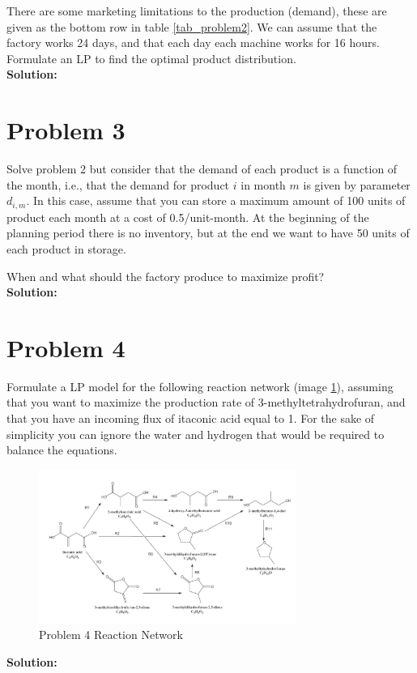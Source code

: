 \documentclass[11pt]{article}
\begin{document}
There are some marketing limitations to the production (demand), these are given as the bottom row in table \ref{tab_problem2}.
We can assume that the factory works 24 days, and that each day each machine works for
16 hours.
Formulate an LP to find the optimal product distribution.
\\
\textbf{Solution: }

\section{Problem 3}
Solve problem 2 but consider that the demand of each product is a function of
the month, i.e., that the demand for product $i$ in month $m$ is given by parameter $d_{i,m}$. In this
case, assume that you can store a maximum amount of 100 units of product each month at
a cost of 0.5/unit-month. At the beginning of the planning period there is no inventory, but at
the end we want to have 50 units of each product in storage.

When and what should the factory produce to maximize profit?
\\
\textbf{Solution: }

\section{Problem 4}
Formulate a LP model for the following reaction network (image \ref{fig:problem_4_rn}), assuming that you want
to maximize the production rate of 3-methyltetrahydrofuran, and that you have an incoming
flux of itaconic acid equal to 1. For the sake of simplicity you can ignore the water and
hydrogen that would be required to balance the equations.
\begin{figure}[htbp]
  \centerline{\includegraphics[width=0.75\textwidth]{images/image.png}}
  \caption{Problem 4 Reaction Network}
  \label{fig:problem_4_rn}
\end{figure}

\textbf{Solution: }
\end{document}
